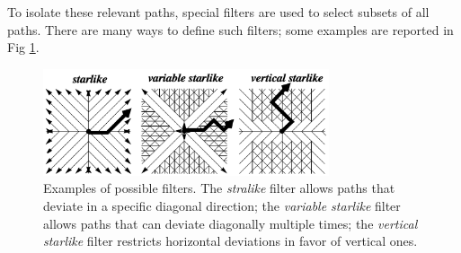 To isolate these relevant paths, special filters are used to select subsets of all paths. There are many ways to define such filters; some examples are reported in Fig \ref{fig:trend_filters}.
\begin{figure}
    \centering
    \includegraphics[width=0.75\textwidth]{img/trend_filters.png}
    \caption{Examples of possible filters. The \textit{stralike} filter allows paths that deviate in a specific diagonal direction; the \textit{variable starlike} filter allows paths that can deviate diagonally multiple times; the \textit{vertical starlike} filter restricts horizontal deviations in favor of vertical ones.}
    \label{fig:trend_filters}
\end{figure}